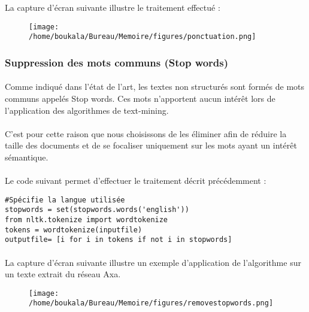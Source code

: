 \documentclass[12pt, a4paper, oneside]{book}
\begin{document}
La capture d'écran suivante illustre le traitement effectué :


\begin{figure}[h!]
\begin{center}
\texttt{[image: /home/boukala/Bureau/Memoire/figures/ponctuation.png]}
\end{center}
\end{figure}



\subsubsection{Suppression des mots communs (Stop words)}
\paragraph{}
Comme indiqué dans l'état de l'art, les textes non structurés sont formés de mots communs appelés Stop words. 
Ces mots n'apportent aucun intérêt lors de l'application des algorithmes de text-mining. 
\paragraph{}
C'est pour cette raison que nous choisissons de les éliminer afin de réduire la taille des documents et de se focaliser uniquement sur les mots ayant un intérêt sémantique.
\paragraph{}
Le code suivant permet d'effectuer le traitement décrit précédemment :

\begin{verbatim}
#Spécifie la langue utilisée 
stopwords = set(stopwords.words('english'))
from nltk.tokenize import wordtokenize
tokens = wordtokenize(inputfile)
outputfile= [i for i in tokens if not i in stopwords]
\end{verbatim}

\paragraph{}
La capture d'écran suivante illustre un exemple d'application de l'algorithme sur un texte extrait du réseau Axa.


\begin{figure}[h!]
\begin{center}
\texttt{[image: /home/boukala/Bureau/Memoire/figures/removestopwords.png]}
\end{center}
\end{figure}
\end{document}
